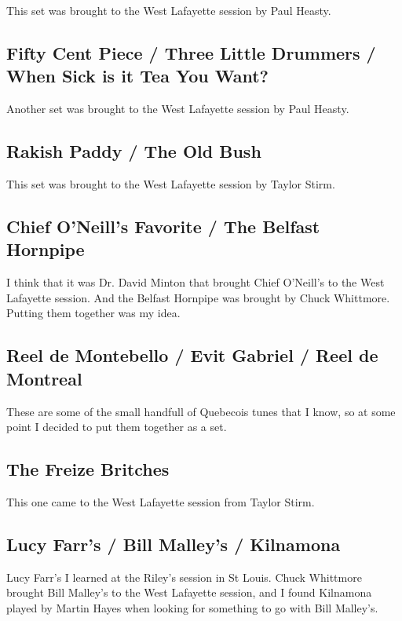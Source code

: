 \documentclass[9pt,letterpaper]{article}
\begin{document}
{This set was brought to the West Lafayette session by Paul Heasty.

\subsection{Fifty Cent Piece / Three Little Drummers / When Sick is it Tea You Want?}

Another set was brought to the West Lafayette session by Paul Heasty.

\subsection{Rakish Paddy / The Old Bush}

This set was brought to the West Lafayette session by Taylor Stirm.

\subsection{Chief O'Neill's Favorite / The Belfast Hornpipe}

I think that it was Dr. David Minton that brought Chief O'Neill's to the West Lafayette session. And the Belfast Hornpipe was brought by Chuck Whittmore. Putting them together was my idea.

\subsection{Reel de Montebello / Evit Gabriel / Reel de Montreal}

These are some of the small handfull of Quebecois tunes that I know, so at some point I decided to put them together as a set.

\subsection{The Freize Britches}

This one came to the West Lafayette session from Taylor Stirm.

\subsection{Lucy Farr's / Bill Malley's / Kilnamona}

Lucy Farr's I learned at the Riley's session in St Louis. Chuck Whittmore brought Bill Malley's to the West Lafayette session, and I found Kilnamona played by Martin Hayes when looking for something to go with Bill Malley's.

}
\end{document}
